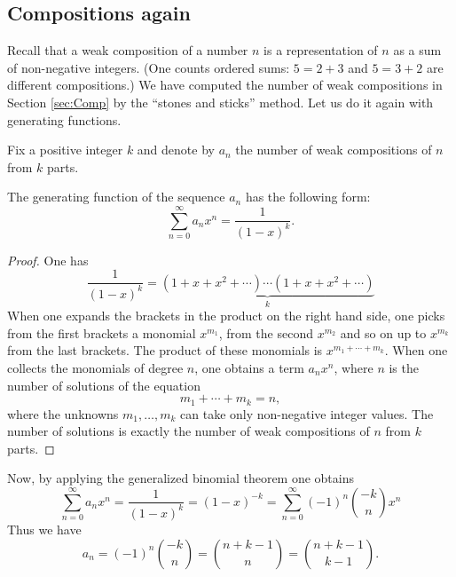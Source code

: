 \begin{page}
\setcounter{section}{3}
\setcounter{subsection}{2}
\setcounter{dfn}{1}
\label{portion:784}

\subsection{Compositions again}
Recall that a weak composition of a number $n$ is a representation of $n$ as a sum of non-negative integers.
(One counts ordered sums: $5 = 2 + 3$ and $5 = 3 + 2$ are different compositions.)
We have computed the number of weak compositions in Section \ref{sec:Comp} by the ``stones and sticks'' method.
Let us do it again with generating functions.

Fix a positive integer $k$ and denote by $a_n$ the number of weak compositions of $n$ from $k$ parts.

\end{page}

\begin{page}
\setcounter{section}{3}
\setcounter{subsection}{2}
\setcounter{dfn}{2}
\label{portion:786}

\begin{thm}
The generating function of the sequence $a_n$ has the following form:
\[
\sum_{n=0}^\infty a_n x^n = \frac{1}{(1-x)^k}.
\]
\end{thm}

\end{page}

\begin{page}
\setcounter{section}{3}
\setcounter{subsection}{3}
\setcounter{dfn}{2}
\label{portion:787}

\begin{proof}
One has
\[
\frac{1}{(1-x)^k} = \underbrace{(1+x+x^2+\cdots)\cdots(1+x+x^2+\cdots)}_{k}
\]
When one expands the brackets in the product on the right hand side,
one picks from the first brackets a monomial $x^{m_1}$, from the second $x^{m_2}$ and so on up to $x^{m_k}$ from the last brackets.
The product of these monomials is $x^{m_1+\cdots+m_k}$.
When one collects the monomials of degree $n$, one obtains a term $a_n x^n$,
where $n$ is the number of solutions of the equation
\[
m_1 + \cdots + m_k = n,
\]
where the unknowns $m_1, \ldots, m_k$ can take only non-negative integer values.
The number of solutions is exactly the number of weak compositions of $n$ from $k$ parts.
\end{proof}

Now, by applying the generalized binomial theorem one obtains
\[
\sum_{n=0}^\infty a_n x^n = \frac{1}{(1-x)^k} = (1-x)^{-k} = \sum_{n=0}^\infty (-1)^n \binom{-k}{n} x^n
\]
Thus we have
\[
a_n = (-1)^n \binom{-k}{n} = \binom{n+k-1}{n} = \binom{n+k-1}{k-1}.
\]




\end{page}

